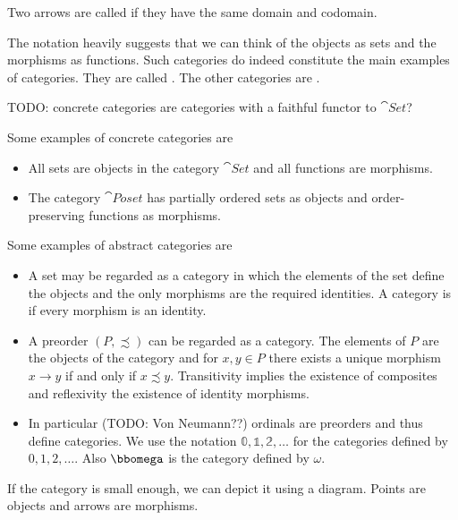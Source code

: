 Two arrows are called  if they have the same domain and codomain.

The notation heavily suggests that we can think of the objects as sets and the morphisms as functions. Such categories do indeed constitute the main examples of categories. They are called . The other categories are .

TODO: concrete categories are categories with a faithful functor to $\cat{Set}$?

\begin{example}
Some examples of concrete categories are
\begin{itemize}
\item All sets are objects in the category $\cat{Set}$ and all functions are morphisms.
\item The category $\cat{Poset}$ has partially ordered sets as objects and order-preserving functions as morphisms.
\end{itemize}
Some examples of abstract categories are
\begin{itemize}
\item A set may be regarded as a category in which the elements of the set define the objects and the only morphisms are the required identities. A category is  if every morphism is an identity.
\item A preorder $(P, \precsim)$ can be regarded as a category. The elements of $P$ are the objects of the category and for $x,y\in P$ there exists a unique morphism $x\to y$ if and only if $x\precsim y$. Transitivity implies the existence of composites and reflexivity the existence of identity morphisms.
\item In particular (TODO: Von Neumann??) ordinals are preorders and thus define categories. We use the notation $\mathbb{0}, \mathbb{1}, \mathbb{2}, \ldots$ for the categories defined by $0,1,2,\ldots$. Also $\bbomega$ is the category defined by $\omega$.
\end{itemize}
\end{example}

If the category is small enough, we can depict it using a diagram. Points are objects and arrows are morphisms.

